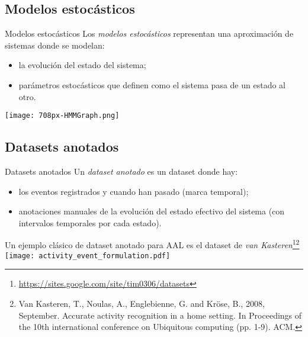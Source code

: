 \documentclass[9pt, handout]{beamer}
\begin{document}
    \subsection{Modelos estocásticos}
      \begin{frame}{Modelos estocásticos}
        Los \textit{modelos estocásticos} representan una aproximación de sistemas donde se modelan:
        \begin{itemize}
          \item la evolución del estado del sistema;
          \item parámetros estocásticos que definen como el sistema pasa de un estado al otro.
        \end{itemize}
        \begin{center}
          \colorbox{white}{\texttt{[image: 708px-HMMGraph.png]}}
        \end{center}
      \end{frame}
    
    \subsection{Datasets anotados}
      \begin{frame}{Datasets anotados}
        Un \textit{dataset anotado} es un dataset donde hay:
        \begin{itemize}
          \item los eventos registrados y cuando han pasado (marca temporal);
          \item anotaciones manuales de la evolución del estado efectivo del sistema (con intervalos temporales por cada estado).
        \end{itemize}
        Un ejemplo clásico de dataset anotado para AAL es el dataset de \textit{van Kasteren}\footnote{\url{https://sites.google.com/site/tim0306/datasets}}\footnote{Van Kasteren, T., Noulas, A., Englebienne, G. and Kröse, B., 2008, September. Accurate activity recognition in a home setting. In Proceedings of the 10th international conference on Ubiquitous computing (pp. 1-9). ACM.}\\[1em]
        
        \texttt{[image: activity\_event\_formulation.pdf]}
      \end{frame}
    
\end{document}
